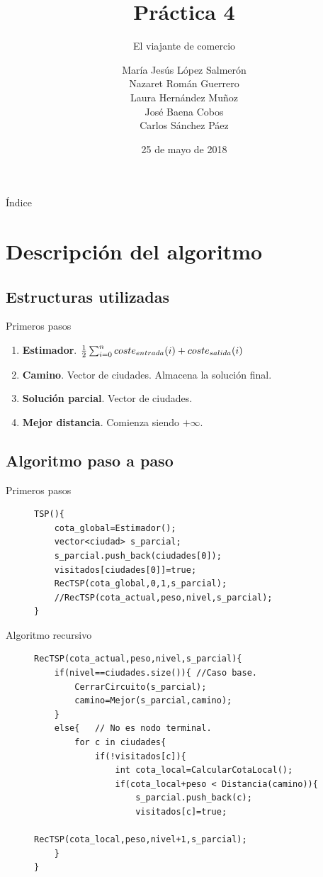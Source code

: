 \documentclass{beamer}
\title{Práctica 4}
\date{25 de mayo de 2018}
\subtitle{El viajante de comercio}
\author{María Jesús López Salmerón \\ Nazaret Román Guerrero \\ Laura Hernández Muñoz \\ José Baena Cobos  \\ Carlos Sánchez Páez}
\begin{document}
\centering
\begin{frame}
  \titlepage
\end{frame}

\begin{frame}{Índice}
  \tableofcontents
\end{frame}

\section{Descripción del algoritmo}

\subsection{Estructuras utilizadas}
\begin{frame}[fragile]{Primeros pasos}
\begin{enumerate}
	\item<+-> \textbf{Estimador}.
	$\centering \frac{1}{2} \sum_{i=0}^{n}coste_{entrada}(i)+coste_{salida}(i)$
	\item<+-> \textbf{Camino}. Vector de ciudades. Almacena la solución final.
	\item<+-> \textbf{Solución parcial}. Vector de ciudades.
	\item<+-> \textbf{Mejor distancia}. Comienza siendo $+\infty$.
\end{enumerate}
\end{frame}
\subsection{Algoritmo paso a paso}

\begin{frame}[fragile]{Primeros pasos}
\begin{figure}[H]
\centering
\begin{verbatim}
TSP(){
	cota_global=Estimador();
	vector<ciudad> s_parcial;
	s_parcial.push_back(ciudades[0]);
	visitados[ciudades[0]]=true;
	RecTSP(cota_global,0,1,s_parcial);
	//RecTSP(cota_actual,peso,nivel,s_parcial);
}
\end{verbatim}
\end{figure}
\end{frame}


\begin{frame}[fragile]{Algoritmo recursivo}
\begin{figure}[H]
\centering
\begin{verbatim}
RecTSP(cota_actual,peso,nivel,s_parcial){
	if(nivel==ciudades.size()){ //Caso base.
		CerrarCircuito(s_parcial);
		camino=Mejor(s_parcial,camino);
	}
	else{	// No es nodo terminal.
		for c in ciudades{
			if(!visitados[c]){
				int cota_local=CalcularCotaLocal();
				if(cota_local+peso < Distancia(camino)){
					s_parcial.push_back(c);
					visitados[c]=true;
					RecTSP(cota_local,peso,nivel+1,s_parcial);
	}
}
\end{verbatim}
\end{figure}
\end{frame}
\end{document}

